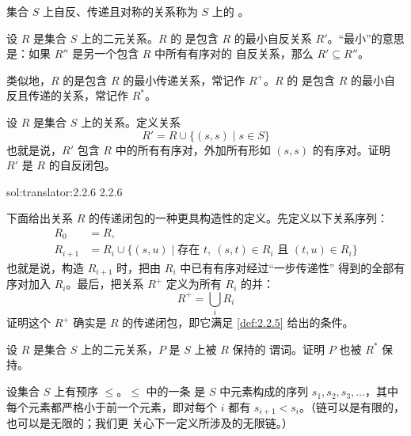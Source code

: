 \begin{definition}
\label{def:2.2.4}
集合 \(S\) 上自反、传递且对称的关系称为 \(S\) 上的
。
\end{definition}

\begin{definition}
\label{def:2.2.5}
设 \(R\) 是集合 \(S\) 上的二元关系。\(R\) 的
是包含 \(R\) 的最小自反关系
\(R'\)。“最小”的意思是：如果 \(R''\) 是另一个包含 \(R\) 中所有有序对的
自反关系，那么 \(R'\subseteq R''\)。

类似地，\(R\) 的是包含 \(R\)
的最小传递关系，常记作 \(R^+\)。\(R\) 的
是包含 \(R\)
的最小自反且传递的关系，常记作 \(R^*\)。
\end{definition}

\begin{exercise}[\(\star\star,\nrightarrow\)]
\label{ex:2.2.6}
设 \(R\) 是集合 \(S\) 上的关系。定义关系
\[
  R'=R\cup\{(s,s)\mid s\in S\}
\]
也就是说，\(R'\) 包含 \(R\) 中的所有有序对，外加所有形如 \((s,s)\)
的有序对。证明 \(R'\) 是 \(R\) 的自反闭包。
\end{exercise}
\taplsolutionlink
  {sol:translator:2.2.6}
  {2.2.6}

\begin{exercise}[\(\star\star,\nrightarrow\)]
\label{ex:2.2.7}
下面给出关系 \(R\) 的传递闭包的一种更具构造性的定义。先定义以下关系序列：
\[
  \begin{aligned}
    R_0     &= R,\\
    R_{i+1} &= R_i\cup
      \{(s,u)\mid \text{存在 }t,\ (s,t)\in R_i\text{ 且 }(t,u)\in R_i\}
  \end{aligned}
\]
也就是说，构造 \(R_{i+1}\) 时，把由 \(R_i\) 中已有有序对经过“一步传递性”
得到的全部有序对加入 \(R_i\)。最后，把关系 \(R^+\) 定义为所有 \(R_i\)
的并：
\[
  R^+=\bigcup_i R_i
\]
证明这个 \(R^+\) 确实是 \(R\) 的传递闭包，即它满足
\cref{def:2.2.5} 给出的条件。
\end{exercise}

\begin{exercise}[\(\star\star,\nrightarrow\)]
\label{ex:2.2.8}
设 \(R\) 是集合 \(S\) 上的二元关系，\(P\) 是 \(S\) 上被 \(R\) 保持的
谓词。证明 \(P\) 也被 \(R^*\) 保持。
\end{exercise}

\begin{definition}
\label{def:2.2.9}
设集合 \(S\) 上有预序 \(\leq\)。\(\leq\) 中的一条
是 \(S\) 中元素构成的序列
\(s_1,s_2,s_3,\ldots\)，其中每个元素都严格小于前一个元素，即对每个
\(i\) 都有 \(s_{i+1}<s_i\)。（链可以是有限的，也可以是无限的；我们更
关心下一定义所涉及的无限链。）
\end{definition}

